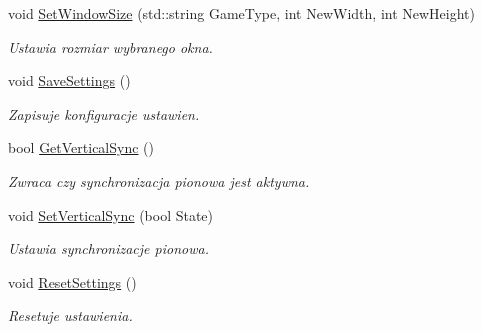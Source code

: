 \begin{DoxyCompactItemize}
\mbox{\label{classtfp_1_1_screen_a7fef3437450fa6e50642793beed28081}} 
void \mbox{\hyperlink{classtfp_1_1_screen_a7fef3437450fa6e50642793beed28081}{Set\+Window\+Size}} (std\+::string Game\+Type, int New\+Width, int New\+Height)
\begin{DoxyCompactList}\small\item\em Ustawia rozmiar wybranego okna. \end{DoxyCompactList}\item 
\mbox{\label{classtfp_1_1_screen_a772f3f5d508d716152c7193873100acd}} 
void \mbox{\hyperlink{classtfp_1_1_screen_a772f3f5d508d716152c7193873100acd}{Save\+Settings}} ()
\begin{DoxyCompactList}\small\item\em Zapisuje konfiguracje ustawien. \end{DoxyCompactList}\item 
\mbox{\label{classtfp_1_1_screen_a1343043f5e05a5f623a231855ede76ae}} 
bool \mbox{\hyperlink{classtfp_1_1_screen_a1343043f5e05a5f623a231855ede76ae}{Get\+Vertical\+Sync}} ()
\begin{DoxyCompactList}\small\item\em Zwraca czy synchronizacja pionowa jest aktywna. \end{DoxyCompactList}\item 
\mbox{\label{classtfp_1_1_screen_a6574eead04fbb2a4fa596fc8e6a19a81}} 
void \mbox{\hyperlink{classtfp_1_1_screen_a6574eead04fbb2a4fa596fc8e6a19a81}{Set\+Vertical\+Sync}} (bool State)
\begin{DoxyCompactList}\small\item\em Ustawia synchronizacje pionowa. \end{DoxyCompactList}\item 
\mbox{\label{classtfp_1_1_screen_ad143e88307318b185382dc563c956cb2}} 
void \mbox{\hyperlink{classtfp_1_1_screen_ad143e88307318b185382dc563c956cb2}{Reset\+Settings}} ()
\begin{DoxyCompactList}\small\item\em Resetuje ustawienia. \end{DoxyCompactList}\end{DoxyCompactItemize}
